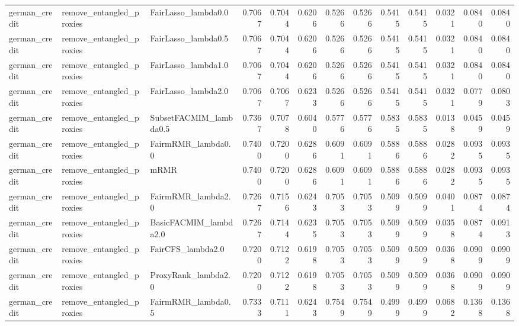 \begin{tabular}{lllrrrrrrrrrr}
german_credit & remove_entangled_proxies & FairLasso_lambda0.0 & 0.7067 & 0.7044 & 0.6206 & 0.5266 & 0.5266 & 0.5415 & 0.5415 & 0.0321 & 0.0840 & 0.0840 \\
german_credit & remove_entangled_proxies & FairLasso_lambda0.5 & 0.7067 & 0.7044 & 0.6206 & 0.5266 & 0.5266 & 0.5415 & 0.5415 & 0.0321 & 0.0840 & 0.0840 \\
german_credit & remove_entangled_proxies & FairLasso_lambda1.0 & 0.7067 & 0.7044 & 0.6206 & 0.5266 & 0.5266 & 0.5415 & 0.5415 & 0.0321 & 0.0840 & 0.0840 \\
german_credit & remove_entangled_proxies & FairLasso_lambda2.0 & 0.7067 & 0.7067 & 0.6233 & 0.5266 & 0.5266 & 0.5415 & 0.5415 & 0.0321 & 0.0779 & 0.0803 \\
german_credit & remove_entangled_proxies & SubsetFACMIM_lambda0.5 & 0.7367 & 0.7078 & 0.6040 & 0.5776 & 0.5776 & 0.5835 & 0.5835 & 0.0138 & 0.0459 & 0.0459 \\
german_credit & remove_entangled_proxies & FairmRMR_lambda0.0 & 0.7400 & 0.7200 & 0.6286 & 0.6091 & 0.6091 & 0.5886 & 0.5886 & 0.0282 & 0.0935 & 0.0935 \\
german_credit & remove_entangled_proxies & mRMR & 0.7400 & 0.7200 & 0.6286 & 0.6091 & 0.6091 & 0.5886 & 0.5886 & 0.0282 & 0.0935 & 0.0935 \\
german_credit & remove_entangled_proxies & FairmRMR_lambda2.0 & 0.7267 & 0.7156 & 0.6243 & 0.7053 & 0.7053 & 0.5099 & 0.5099 & 0.0401 & 0.0874 & 0.0874 \\
german_credit & remove_entangled_proxies & BasicFACMIM_lambda2.0 & 0.7267 & 0.7144 & 0.6235 & 0.7053 & 0.7053 & 0.5099 & 0.5099 & 0.0358 & 0.0874 & 0.0913 \\
german_credit & remove_entangled_proxies & FairCFS_lambda2.0 & 0.7200 & 0.7122 & 0.6198 & 0.7053 & 0.7053 & 0.5099 & 0.5099 & 0.0368 & 0.0909 & 0.0909 \\
german_credit & remove_entangled_proxies & ProxyRank_lambda2.0 & 0.7200 & 0.7122 & 0.6198 & 0.7053 & 0.7053 & 0.5099 & 0.5099 & 0.0368 & 0.0909 & 0.0909 \\
german_credit & remove_entangled_proxies & FairmRMR_lambda0.5 & 0.7333 & 0.7111 & 0.6243 & 0.7549 & 0.7549 & 0.4999 & 0.4999 & 0.0682 & 0.1368 & 0.1368 \\
\bottomrule
\end{tabular}
